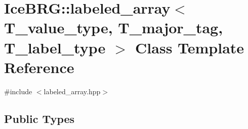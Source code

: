\hypertarget{classIceBRG_1_1labeled__array}{}\section{Ice\+B\+R\+G\+:\+:labeled\+\_\+array$<$ T\+\_\+value\+\_\+type, T\+\_\+major\+\_\+tag, T\+\_\+label\+\_\+type $>$ Class Template Reference}
\label{classIceBRG_1_1labeled__array}


{\ttfamily \#include $<$labeled\+\_\+array.\+hpp$>$}

\subsection*{Public Types}
